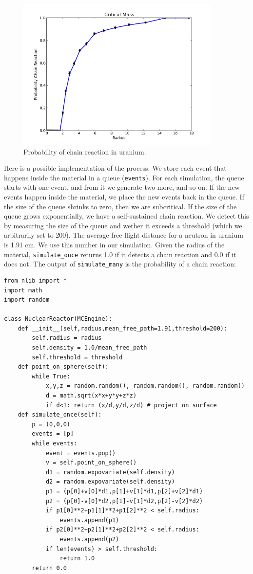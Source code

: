 \documentclass[justified,sixbynine]{tufte-book}
\def\ft{\small\tt}
\theoremstyle{plain}%
\theoremstyle{definition}
\theoremstyle{remark}
\begin{document}
\begin{fullwidth}
\begin{figure}[ht]
\centering\includegraphics[width=4in]{images/nuclear.png}
\caption{Probability of chain reaction in uranium.\label{nuclear2}}
\end{figure}

Here is a possible implementation of the process. We store each event that happens inside the material in a queue ({\ft events}). For each simulation, the queue starts with one event, and from it we generate two more, and so on. If the new events happen inside the material, we place the new events back in the queue. If the size of the queue shrinks to zero, then we are subcritical. If the size of the queue grows exponentially, we have a self-sustained chain reaction. We detect this by measuring the size of the queue and wether it exceeds a threshold (which we arbitrarily set to 200). The average free flight distance for a neutron in  uranium is 1.91 cm. We use this number in our simulation. Given the radius of the material, {\ft simulate\_once} returns 1.0 if it detects a chain reaction and 0.0 if it does not. The output of {\ft simulate\_many} is the probability of a chain reaction:


\begin{lstlisting}[caption={in file: {\ft nuclear.py}}]
from nlib import *
import math
import random

class NuclearReactor(MCEngine):
    def __init__(self,radius,mean_free_path=1.91,threshold=200):
        self.radius = radius
        self.density = 1.0/mean_free_path
        self.threshold = threshold
    def point_on_sphere(self):
        while True:
            x,y,z = random.random(), random.random(), random.random()
            d = math.sqrt(x*x+y*y+z*z)
            if d<1: return (x/d,y/d,z/d) # project on surface
    def simulate_once(self):
        p = (0,0,0)
        events = [p]
        while events:
            event = events.pop()
            v = self.point_on_sphere()
            d1 = random.expovariate(self.density)
            d2 = random.expovariate(self.density)
            p1 = (p[0]+v[0]*d1,p[1]+v[1]*d1,p[2]+v[2]*d1)
            p2 = (p[0]-v[0]*d2,p[1]-v[1]*d2,p[2]-v[2]*d2)
            if p1[0]**2+p1[1]**2+p1[2]**2 < self.radius:
                events.append(p1)
            if p2[0]**2+p2[1]**2+p2[2]**2 < self.radius:
                events.append(p2)
            if len(events) > self.threshold:
                return 1.0
        return 0.0


\end{lstlisting}
\end{fullwidth}
\end{document}
